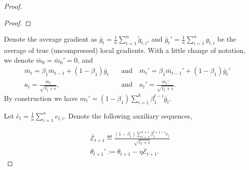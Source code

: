 \documentclass[11pt]{article}
\begin{document}
\begin{proof}
\begin{proof}
\end{proof}


Denote the average gradient as $\bar g_t=\frac{1}{n}\sum_{i=1}^n \tilde g_{t,i}$, and $\bar g_t'=\frac{1}{n}\sum_{i=1}^n g_{t,i}$ be the average of true (uncompressed) local gradients. With a little change of notation, we denote $\bar m_0=\bar m_0'=0$, and
\begin{align*}
\bar m_t=\beta_1 \bar m_{t-1}+(1-\beta_1)\bar g_t \quad & \textrm{and} \quad \bar m_t'=\beta_1 \bar m_{t-1}'+(1-\beta_1) \bar g_t'\\
    a_t=\frac{\bar m_t}{\sqrt{\hat v_t+\epsilon}},\quad & \textrm{and} \quad  a_t'=\frac{\bar m_t'}{\sqrt{\hat v_t+\epsilon}}.
\end{align*}
By construction we have $m_t'=(1-\beta_1)\sum_{i=1}^k\beta_1^{t-i} \bar g_t$. 

Let $\bar e_t=\frac{1}{n}\sum_{i=1}^n e_{t,i}$. Denote the following auxiliary sequences,

\begin{align*}
& \bar{\mathcal E}_{t+1}\eqdef \frac{(1-\beta_1)\sum_{i=1}^{t+1} \beta_1^{t+1-i} \bar e_i}{\sqrt{\hat v_t+\epsilon}}\\
&\theta_{t+1}':=\theta_{t+1}-\eta\mathcal E_{t+1}.
\end{align*}


\end{proof}
\end{document}
